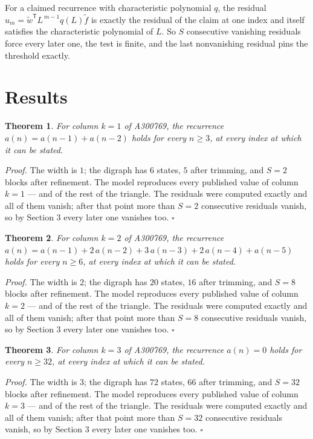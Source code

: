 \documentclass[11pt]{article}
\newtheorem{theorem}{Theorem}
\theoremstyle{definition}
\begin{document}
For a claimed recurrence with characteristic polynomial $q$, the residual $u_m = \tilde w^{\mathsf T}L^{\,m-1}q(L)\tilde f$ is exactly the residual of the claim at one index and itself satisfies the characteristic polynomial of $L$. So $S$ consecutive vanishing residuals force every later one, the test is finite, and the last nonvanishing residual pins the threshold exactly.

\section{Results}

\begin{theorem} For column $k = 1$ of A300769, the recurrence $a(n) = a(n-1) + a(n-2)$ holds for every $n \ge 3$, at every index at which it can be stated.\end{theorem}

{\itshape Proof.} The width is $1$; the digraph has $6$ states, $5$ after trimming, and $S = 2$ blocks after refinement. The model reproduces every published value of column $k = 1$ --- and of the rest of the triangle. The residuals were computed exactly and all of them vanish; after that point more than $S = 2$ consecutive residuals vanish, so by Section 3 every later one vanishes too. $\square$

\begin{theorem} For column $k = 2$ of A300769, the recurrence $a(n) = a(n-1) + 2\,a(n-2) + 3\,a(n-3) + 2\,a(n-4) + a(n-5)$ holds for every $n \ge 6$, at every index at which it can be stated.\end{theorem}

{\itshape Proof.} The width is $2$; the digraph has $20$ states, $16$ after trimming, and $S = 8$ blocks after refinement. The model reproduces every published value of column $k = 2$ --- and of the rest of the triangle. The residuals were computed exactly and all of them vanish; after that point more than $S = 8$ consecutive residuals vanish, so by Section 3 every later one vanishes too. $\square$

\begin{theorem} For column $k = 3$ of A300769, the recurrence $a(n) = 0$ holds for every $n \ge 32$, at every index at which it can be stated.\end{theorem}

{\itshape Proof.} The width is $3$; the digraph has $72$ states, $66$ after trimming, and $S = 32$ blocks after refinement. The model reproduces every published value of column $k = 3$ --- and of the rest of the triangle. The residuals were computed exactly and all of them vanish; after that point more than $S = 32$ consecutive residuals vanish, so by Section 3 every later one vanishes too. $\square$
\end{document}
